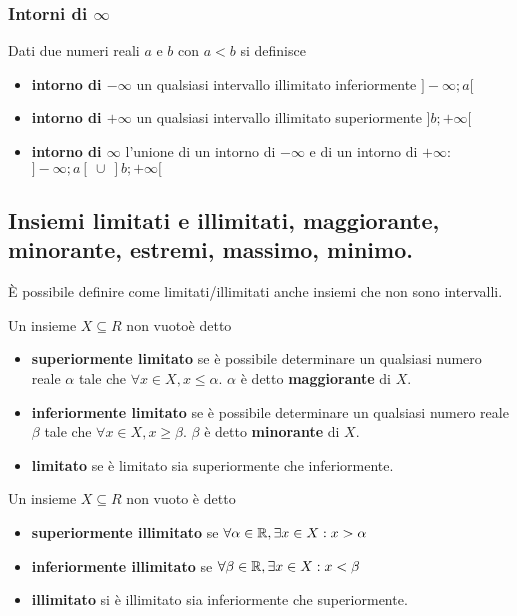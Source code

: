 \subsubsection{Intorni di $\infty$}
\begin{boxdef}
    Dati due numeri reali $a$ e $b$ con $a<b$ si definisce 
    \begin{itemize}
        \item \textbf{intorno di $-\infty$} un qualsiasi intervallo illimitato inferiormente $]-\infty;a[$
        \item \textbf{intorno di $+\infty$} un qualsiasi intervallo illimitato superiormente $]b;+\infty[$
        \item \textbf{intorno di $\infty$} l'unione di un intorno di $-\infty$ e di un intorno di $+\infty$: $]-\infty;a[\  \cup\  ]b;+\infty[$
    \end{itemize}
\end{boxdef}
\subsection{Insiemi limitati e illimitati, maggiorante, minorante, estremi, massimo, minimo.}
È possibile definire come limitati/illimitati anche insiemi che non sono intervalli. 
\begin{boxdef}
    Un insieme $X\subseteq R$ non vuotoè detto
    \begin{itemize}
        \item \textbf{superiormente limitato} se è possibile determinare un qualsiasi numero reale $\alpha$ tale che $\forall x \in X, x\leq \alpha$. $\alpha$ è detto \textbf{maggiorante} di $X$.
        \item \textbf{inferiormente limitato} se è possibile determinare un qualsiasi numero reale $\beta$ tale che $\forall x \in X, x\geq \beta$. $\beta$ è detto \textbf{minorante} di $X$.
        \item \textbf{limitato} se è limitato sia superiormente che inferiormente.
    \end{itemize}
\end{boxdef}
\begin{boxdef}
    Un insieme $X\subseteq R$ non vuoto è detto 
    \begin{itemize}
        \item \textbf{superiormente illimitato} se $\forall \alpha \in \mathbb{R}, \exists x \in X : x>\alpha$
        \item \textbf{inferiormente illimitato} se $\forall \beta \in \mathbb{R}, \exists x \in X : x<\beta$
        \item \textbf{illimitato} si è illimitato sia inferiormente che superiormente.
    \end{itemize}
\end{boxdef}


